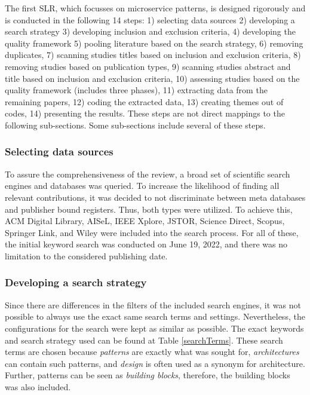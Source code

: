 \documentclass{bmcart}
\begin{document}
The first SLR, which focusses on microservice patterns, is designed rigorously and is conducted in the following 14 steps: 1) selecting data sources 2) developing a search strategy 3) developing inclusion and exclusion criteria, 4) developing the quality framework 5) pooling literature based on the search strategy, 6) removing duplicates, 7) scanning studies titles based on inclusion and exclusion criteria, 8) removing studies based on publication types, 9) scanning studies abstract and title based on inclusion and exclusion criteria, 10) assessing studies based on the quality framework (includes three phases), 11) extracting data from the remaining papers, 12) coding the extracted data, 13) creating themes out of codes, 14) presenting the results. These steps are not direct mappings to the following sub-sections. Some sub-sections include several of these steps.


\subsubsection{Selecting data sources}

To assure the comprehensiveness of the review, a broad set of scientific search engines and databases was queried. To increase the likelihood of finding all relevant contributions, it was decided to not discriminate between meta databases and publisher bound registers. Thus, both types were utilized. To achieve this, ACM Digital Library, AISeL, IEEE Xplore, JSTOR, Science Direct, Scopus, Springer Link, and Wiley were included into the search process. For all of these, the initial keyword search was conducted on June 19, 2022, and there was no limitation to the considered publishing date.

\subsubsection{Developing a search strategy}

Since there are differences in the filters of the included search engines, it was not possible to always use the exact same search terms and settings. Nevertheless, the configurations for the search were kept as similar as possible. The exact keywords and search strategy used can be found at Table \ref{searchTerms}. These search terms are chosen because \emph{patterns} are exactly what was sought for, \emph{architectures} can contain such patterns, and \emph{design} is often used as a synonym for architecture. Further, patterns can be seen as \emph{building blocks}, therefore, the building blocks was also included. 
\end{document}
